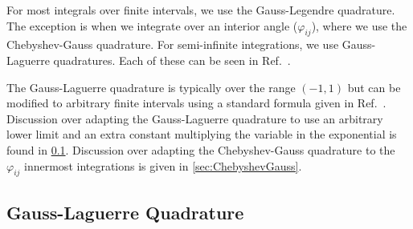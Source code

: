 \documentclass[Dissertation.tex]{subfiles}
\begin{document}
For most integrals over finite intervals, we use the Gauss-Legendre quadrature.
The exception is when we integrate over an interior angle ($\varphi_{ij}$),
where we use the Chebyshev-Gauss quadrature. For semi-infinite integrations,
we use Gauss-Laguerre quadratures. Each of these can be seen in
Ref.~\cite[p.887-890]{Abramowitz1965}.

The Gauss-Laguerre quadrature is typically over the range $(-1,1)$ but can be
modified to arbitrary finite intervals using a standard formula given in
Ref.~\cite[p.887]{Abramowitz1965}. Discussion over adapting the Gauss-Laguerre
quadrature to use an arbitrary lower limit and an extra constant multiplying
the variable in the exponential is found in \cref{sec:GaussLag}. Discussion over
adapting the Chebyshev-Gauss quadrature to the $\varphi_{ij}$ innermost
integrations is given in \cref{sec:ChebyshevGauss}.




\subsection{Gauss-Laguerre Quadrature}
\label{sec:GaussLag}
\end{document}
